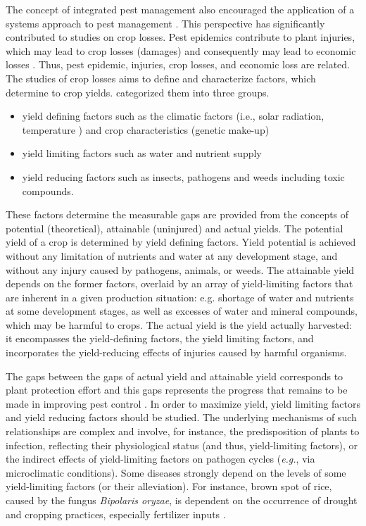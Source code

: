 The concept of integrated pest management also encouraged the application of a systems approach to pest management \citep{teng1992implementing}. This perspective has significantly contributed to studies on crop losses. Pest epidemics contribute to plant injuries, which may lead to crop losses (damages) and consequently may lead to economic losses \citep{Zadok1985}. Thus, pest epidemic, injuries, crop losses, and economic loss are related. 
The studies of crop losses aims to define and characterize factors, which determine to crop yields. \citet{rabbinge1993ecological} categorized them into three groups.

\begin{itemize}
\item yield defining factors such as the climatic factors (i.e., solar radiation, temperature ) and crop characteristics (genetic make-up)
\item yield limiting factors such as water and nutrient supply
\item yield reducing factors such as insects, pathogens and weeds including toxic compounds.
\end{itemize} 
 
These factors determine the measurable gaps are provided from the concepts of potential (theoretical), attainable (uninjured) and actual yields. The potential yield of a crop is determined by yield defining factors. Yield potential is achieved without any limitation of nutrients and water at any development stage, and without any injury caused by pathogens, animals, or weeds. The attainable yield depends on the former factors, overlaid by an array of yield-limiting factors that are inherent in a given production situation: e.g. shortage of water and nutrients at some development stages, as well as excesses of water and mineral compounds, which may be harmful to crops. The actual yield is the yield actually harvested: it encompasses the yield-defining factors, the yield limiting factors, and incorporates the yield-reducing effects of injuries caused by harmful organisms. 

The gaps between the gaps of actual yield and attainable yield corresponds to plant protection effort and this gaps represents the progress that remains to be made in improving pest control \citep{OERKE:2006ct}. In order to maximize yield, yield limiting factors and yield reducing factors should be studied. The underlying mechanisms of such relationships are complex \citep{Zadoks:1979ts} and involve, for instance, the predisposition of plants to infection, reflecting their physiological status (and thus, yield-limiting factors), or the indirect effects of yield-limiting factors on pathogen cycles (\textit{e.g.}, via microclimatic conditions). Some diseases strongly depend on the levels of some yield-limiting factors (or their alleviation). For instance, brown spot of rice, caused by the fungus \textit{Bipolaris oryzae}, is dependent on the occurrence of drought and cropping practices, especially fertilizer inputs \citep{barnwal2013review}.

